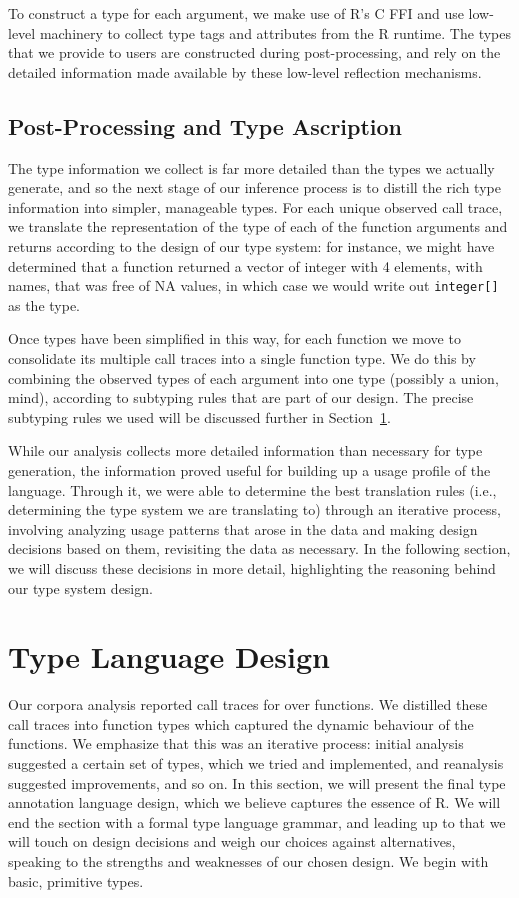 \documentclass[acmsmall,review,anonymous]{acmart}\settopmatter{printfolios=true,printccs=false,printacmref=false}
\newcommand{\code}[1]{{\lstinline[style=Rin]!#1!}\xspace}
\begin{document}
To construct a type for each argument, we make use of R's C FFI and use
low-level machinery to collect type tags and attributes from the R runtime.
The types that we provide to users are constructed during post-processing,
and rely on the detailed information made available by these low-level
reflection mechanisms.

%
%
%
%
\subsection{Post-Processing and Type Ascription}

The type information we collect is far more detailed than the types we
actually generate, and so the next stage of our inference process is to
distill the rich type information into simpler, manageable types.  For each
unique observed call trace, we translate the representation of the type of
each of the function arguments and returns according to the design of our
type system: for instance, we might have determined that a function returned
a vector of integer with 4 elements, with names, that was free of NA values,
in which case we would write out \code{integer[]} as the type.

Once types have been simplified in this way, for each function we move to
consolidate its multiple call traces into a single function type.  We do
this by combining the observed types of each argument into one type
(possibly a union, mind), according to subtyping rules that are part of our
design.  The precise subtyping rules we used will be discussed further in
Section~\ref{sec:typesystemdesign}.

While our analysis collects more detailed information than necessary for
type generation, the information proved useful for building up a usage
profile of the language. Through it, we were able to determine the best
translation rules (i.e., determining the type system we are translating to)
through an iterative process, involving analyzing usage patterns that arose
in the data and making design decisions based on them, revisiting the data
as necessary.  In the following section, we will discuss these decisions in
more detail, highlighting the reasoning behind our type system design.

%
%
%
%
%
%
\section{Type Language Design}
\label{sec:typesystemdesign}

Our corpora analysis reported  call traces for over 
functions.  We distilled these call traces into function types which
captured the dynamic behaviour of the functions.  We emphasize that this was
an iterative process: initial analysis suggested a certain set of types,
which we tried and implemented, and reanalysis suggested improvements,
and so on.  In this section, we will present the final type annotation language design, 
which we believe captures the essence of R.  We will end the section with a formal type 
language grammar, and leading up to that we will
touch on design decisions and weigh our choices against alternatives,
speaking to the strengths and weaknesses of our chosen design.
We begin with basic, primitive types.
\end{document}
